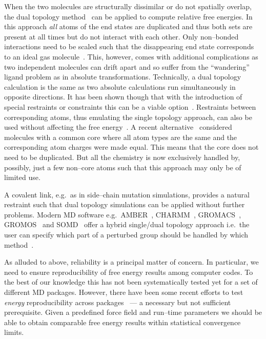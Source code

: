 \documentclass[journal=jctcce,manuscript=article]{achemso}
\begin{document}
When the two molecules are structurally dissimilar or do not spatially overlap, 
the dual topology method~\cite{doi:10.1021/j100056a020, doi:10.1021/jp981628n} 
can be applied to compute relative free energies.  In this approach \emph{all} 
atoms of the end states are duplicated and thus both sets are present at all
times but do not interact with each other.  Only non--bonded
interactions need to be scaled such that the disappearing end state
corresponds to an ideal gas molecule~\cite{doi:10.1021/jp981628n}.
This, however, comes with additional complications as two independent
molecules can drift apart and so suffer from the ``wandering'' ligand
problem as in absolute transformations\cite{GILSON19971047,
doi:10.1021/jp0217839, deng_computations_2009}.  Technically, a dual topology 
calculation is the same as two absolute calculations run simultaneously in 
opposite directions.  It has been shown though that with the introduction of 
special restraints or constraints this can be a viable 
option~\cite{doi:10.1021/ct700081t,
  rocklin_separated_2013, JCC:Axelsen-Li}.  Restraints between 
corresponding atoms, thus emulating the single topology approach, can also be 
used without affecting the free energy~\cite{JCC:Axelsen-Li}.  A recent 
alternative~\cite{doi:10.1021/acs.jctc.5b00179} considered molecules with a
common core where all atom types are the same and the corresponding atom 
charges were made equal.  This means that the core does not need to be 
duplicated.  But all the chemistry is now exclusively handled by, possibly, 
just a few non--core atoms such that this approach may only be of limited use.

A covalent link, e.g.\ as in side--chain
mutation simulations, provides a natural restraint such that dual
topology simulations can be applied without further problems.  Modern
MD software e.g.\ AMBER~\cite{case_amber_2005},
CHARMM~\cite{JCC:JCC21287}, GROMACS~\cite{Abraham201519},
GROMOS~\cite{doi:10.1021/jp984217f} and SOMD~\cite{Sire-2016,
  doi:10.1021/ct300857j}
offer a hybrid single/dual topology approach
i.e.\ the user can specify which part of a perturbed group should be
handled by which method~\cite{doi:10.1021/jp994193s}.

As alluded to above, reliability is a principal matter of concern.  In
particular, we need to ensure reproducibility of free energy results
among computer codes.  To the best of our knowledge this has not been
systematically tested yet for a set of different MD packages. 
However, there have been some recent efforts to test \emph{energy} 
reproducibility across packages~\cite{Shirts2017} --- a necessary but not 
sufficient prerequisite.  Given a
predefined force field and run--time parameters we should be able to
obtain comparable free energy results within statistical convergence
limits.  
\end{document}
